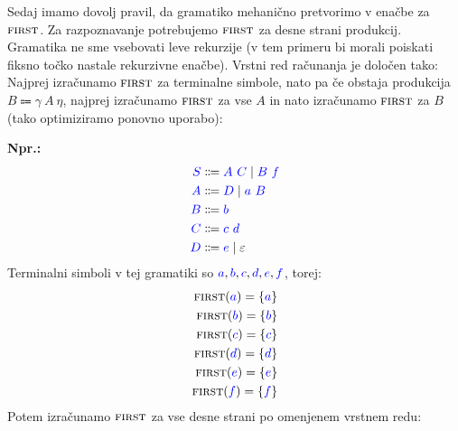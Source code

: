 \documentclass{article}
\newcommand{\Ex}{\textbf{Npr.:}\ }
\newcommand{\FIRST}{\textsc{first}}
\newcommand{\Symbol}[1]{\textcolor{blue}{#1}}
\newcommand{\Null}{\varepsilon}
\newcommand{\Arrow}{\Coloneq}
\newcommand{\Seq}{\ }
\newcommand{\Union}{\mathrel{|}}
\begin{document}
Sedaj imamo dovolj pravil, da gramatiko mehanično pretvorimo v enačbe za $\FIRST$.
Za razpoznavanje potrebujemo $\FIRST$ za desne strani produkcij.
Gramatika ne sme vsebovati leve rekurzije (v tem primeru bi morali poiskati fiksno točko nastale rekurzivne enačbe).
Vrstni red računanja je določen tako: Najprej izračunamo $\FIRST$ za terminalne simbole, nato pa če obstaja produkcija ${B \Arrow \gamma \Seq A \Seq \eta}$, najprej izračunamo $\FIRST$ za vse $A$ in nato izračunamo $\FIRST$ za $B$ (tako optimiziramo ponovno uporabo):

\Ex
\begin{equation*}
  \begin{aligned}
    \Symbol{S} &\Arrow \Symbol{A} \Seq \Symbol{C} \Union \Symbol{B} \Seq \Symbol{f} \\
    \Symbol{A} &\Arrow \Symbol{D} \Union \Symbol{a} \Seq \Symbol{B} \\
    \Symbol{B} &\Arrow \Symbol{b}\\
    \Symbol{C} &\Arrow \Symbol{c} \Seq \Symbol{d}\\
    \Symbol{D} &\Arrow \Symbol{e} \Union \Null
  \end{aligned}
\end{equation*}
Terminalni simboli v tej gramatiki so $\Symbol{a}, \Symbol{b}, \Symbol{c}, \Symbol{d}, \Symbol{e}, \Symbol{f}$, torej:
\begin{align*}
  \FIRST(\Symbol{a}) = \{\Symbol{a}\}\\
  \FIRST(\Symbol{b}) = \{\Symbol{b}\}\\
  \FIRST(\Symbol{c}) = \{\Symbol{c}\}\\
  \FIRST(\Symbol{d}) = \{\Symbol{d}\}\\
  \FIRST(\Symbol{e}) = \{\Symbol{e}\}\\
  \FIRST(\Symbol{f}) = \{\Symbol{f}\}
\end{align*}
Potem izračunamo $\FIRST$ za vse desne strani po omenjenem vrstnem redu:
\end{document}
